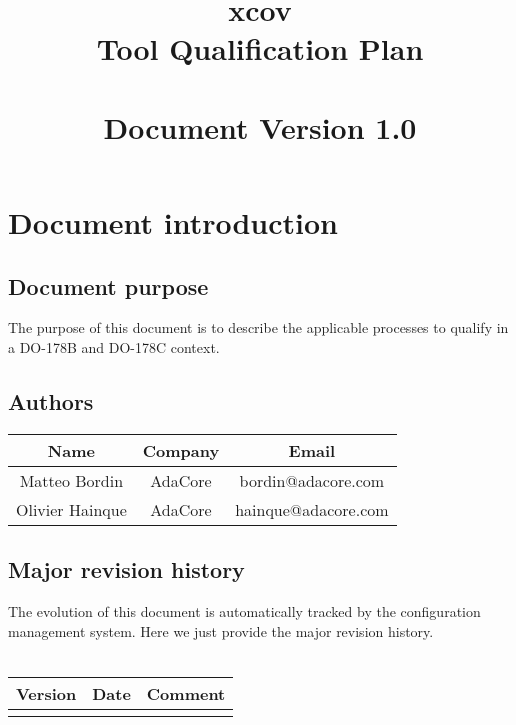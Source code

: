 \documentclass {report}
\begin{document}
\title{\huge
  xcov{}\\
  Tool Qualification Plan\\ \ \\
  \large \textbf{Document Version 1.0}}

\maketitle
\tableofcontents

\chapter{Document introduction}

\section{Document purpose}
The purpose of this document is to describe the applicable processes to
qualify \xcov{} in a DO-178B and DO-178C context.

\section{Authors}
\begin{tabular}{|c|c|c|}
\hline
\textbf{Name} & \textbf{Company} & \textbf{Email} \\ \hline
Matteo Bordin & AdaCore & bordin@adacore.com \\ \hline
Olivier Hainque & AdaCore & hainque@adacore.com \\ \hline
\end{tabular}

\section{Major revision history}

The evolution of this document is automatically tracked by the configuration
management system. Here we just provide the major revision history.  \ \\ \\
\begin{tabular}{|c|c|c|}
\hline
\textbf{Version} & \textbf{Date} & \textbf{Comment} \\ \hline
 &  &  \\ \hline
\end{tabular}


\end{document}
